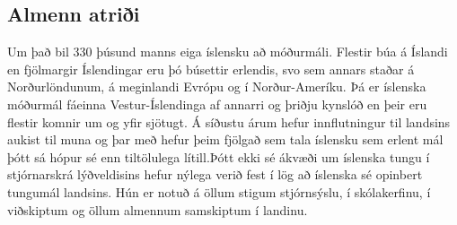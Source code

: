 \documentclass{../../metanetpaper}
\begin{document}
\begin{multicols}{2}

\subsection{Almenn atriði}

Um það bil 330 þúsund manns eiga íslensku að móðurmáli. Flestir búa á Íslandi \cite{hag1}  en fjölmargir Íslendingar eru þó búsettir erlendis\cite{vis1},  svo sem annars staðar á Norðurlöndunum, á meginlandi Evrópu og í Norður-Ameríku. Þá er íslenska móðurmál fáeinna Vestur-Íslendinga af annarri og þriðju kynslóð \cite{can1}  en þeir eru flestir komnir um og yfir sjötugt. Á síðustu árum hefur innflutningur til landsins aukist til muna og þar með hefur þeim fjölgað sem tala íslensku sem erlent mál þótt sá hópur sé enn tiltölulega lítill.Þótt ekki sé ákvæði um íslenska tungu í stjórnarskrá lýðveldisins hefur nýlega verið fest í lög að íslenska sé opinbert tungumál landsins\cite{alt1}. Hún er notuð á öllum stigum stjórnsýslu, í skólakerfinu, í viðskiptum og öllum almennum samskiptum í landinu. 


\end{multicols}
\end{document}
